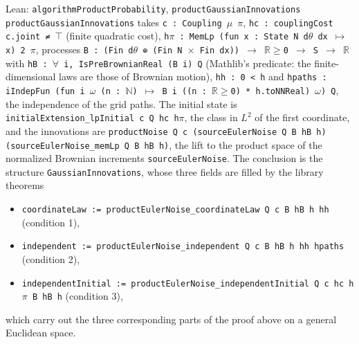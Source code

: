 \documentclass[11pt,a4paper]{report}
\begin{document}
\begin{leanbox}{Lean: \texttt{algorithmProductProbability}, \texttt{productGaussianInnovations}}
\texttt{product\allowbreak{}Gaussian\allowbreak{}Innovations} takes \texttt{c : Coupling \ensuremath{\mu} \ensuremath{\pi}}, \texttt{hc : coupling\allowbreak{}Cost c.\allowbreak{}joint ≠ \ensuremath{\top}} (finite quadratic cost), \texttt{h\ensuremath{\pi} : Mem\allowbreak{}Lp (fun x : State N d\ensuremath{\theta} dx \ensuremath{\mapsto} x) 2 \ensuremath{\pi}}, processes \texttt{B : (Fin d\ensuremath{\theta} ⊕ (Fin N \ensuremath{\times} Fin dx)) \ensuremath{\to} \ensuremath{\mathbb R}\ensuremath{\ge}0 \ensuremath{\to} S \ensuremath{\to} \ensuremath{\mathbb R}} with \texttt{h\allowbreak{}B : \ensuremath{\forall} i, Is\allowbreak{}Pre\allowbreak{}Brownian\allowbreak{}Real (B i) Q} (Mathlib's predicate: the finite-dimensional laws are those of Brownian motion), \texttt{hh : 0 < h} and \texttt{hpaths : i\allowbreak{}Indep\allowbreak{}Fun (fun i \ensuremath{\omega} (n : \ensuremath{\mathbb N}) \ensuremath{\mapsto} B i ((n : \ensuremath{\mathbb R}\ensuremath{\ge}0) * h.\allowbreak{}to\allowbreak{}NNReal) \ensuremath{\omega}) Q}, the independence of the grid paths. The initial state is \texttt{initial\allowbreak{}Extension\_\allowbreak{}lp\allowbreak{}Initial c Q hc h\ensuremath{\pi}}, the class in \(L^2\) of the first coordinate, and the innovations are \texttt{product\allowbreak{}Noise Q c (source\allowbreak{}Euler\allowbreak{}Noise Q B h\allowbreak{}B h) (source\allowbreak{}Euler\allowbreak{}Noise\_\allowbreak{}mem\allowbreak{}Lp Q B h\allowbreak{}B h)}, the lift to the product space of the normalized Brownian increments \texttt{source\allowbreak{}Euler\allowbreak{}Noise}. The conclusion is the structure \texttt{Gaussian\allowbreak{}Innovations}, whose three fields are filled by the library theorems



\begin{itemize}


\item \texttt{coordinate\allowbreak{}Law := product\allowbreak{}Euler\allowbreak{}Noise\_\allowbreak{}coordinate\allowbreak{}Law Q c B h\allowbreak{}B h hh} (condition 1),

\item \texttt{independent := product\allowbreak{}Euler\allowbreak{}Noise\_\allowbreak{}independent Q c B h\allowbreak{}B h hh hpaths} (condition 2),

\item \texttt{independent\allowbreak{}Initial := product\allowbreak{}Euler\allowbreak{}Noise\_\allowbreak{}independent\allowbreak{}Initial Q c hc h\ensuremath{\pi} B h\allowbreak{}B h} (condition 3),

\end{itemize}



which carry out the three corresponding parts of the proof above on a general Euclidean space.
\end{leanbox}
\end{document}
